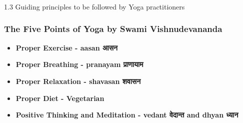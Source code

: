 \begin{frame}[fragile]\frametitle{}
\begin{center}
{\Large 1.3 Guiding principles to be followed by Yoga practitioners}
\end{center}
\end{frame}

\begin{frame}[fragile]\frametitle{The Five Points of Yoga by Swami Vishnudevananda}
    \begin{itemize}
        \item \textbf{Proper Exercise - aasan आसन}
            
            
        \item \textbf{Proper Breathing - pranayam प्राणायाम}
            
            
        \item \textbf{Proper Relaxation - shavasan  शवासन }
            
            
        \item \textbf{Proper Diet - Vegetarian}
            
            
        \item \textbf{Positive Thinking and Meditation - vedant  वेदान्त  and dhyan ध्यान }
            
            
    \end{itemize}
\end{frame}


